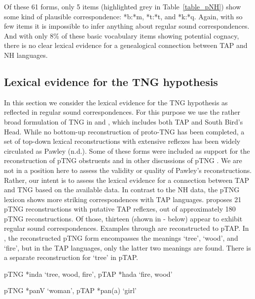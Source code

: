 Of these 61 forms, only 5 items (highlighted grey in Table~\ref{table_pNH}) show some kind of plausible correspondence: *b:*m, *t:*t, and *k:*q. Again, with so few items it is impossible to infer anything about regular sound correspondences. And with only 8\% of these basic vocabulary items showing potential cognacy, there is no clear lexical evidence for a genealogical connection between TAP and NH languages.

\subsection{Lexical evidence for the TNG hypothesis}

In this section we consider the lexical evidence for the TNG hypothesis as reflected in regular sound correspondences. For this purpose we use the rather broad formulation of TNG in \citet{Pawley2005} and \citet{Ross2005}, which includes both TAP and South Bird's Head. While no bottom-up reconstruction of proto-TNG has been completed, a set of top-down lexical reconstructions with extensive reflexes has been widely circulated as Pawley (n.d.). Some of these forms were included as support for the reconstruction of pTNG obstruents \citep{Pawley2001} and in other discussions of pTNG \citep{Pawley1998,Pawley2012}. We are not in a position here to assess the validity or quality of Pawley's reconstructions. Rather, our intent is to assess the lexical evidence for a connection between TAP and TNG based on the available data. In contrast to the NH data, the pTNG lexicon shows more striking correspondences with TAP languages. \citet{Pawleynd} proposes 21 pTNG reconstructions with putative TAP reflexes, out of approximately
180 pTNG reconstructions. Of those, thirteen (shown in - below) appear to exhibit regular sound correspondences. Examples  through  are reconstructed to pTAP. In , the reconstructed pTNG form encompasses the meanings `tree', `wood', and `fire', but in the TAP languages, only the latter two meanings are found. There is a separate reconstruction for `tree' in pTAP.

\ea%
\label{ex:4:35}
\upshape   pTNG *inda `tree, wood, fire', pTAP *hada `fire, wood'  
\z

\ea%
\label{ex:4:36}
\upshape   pTNG *panV `woman', pTAP *pan(a) `girl'  
\z

